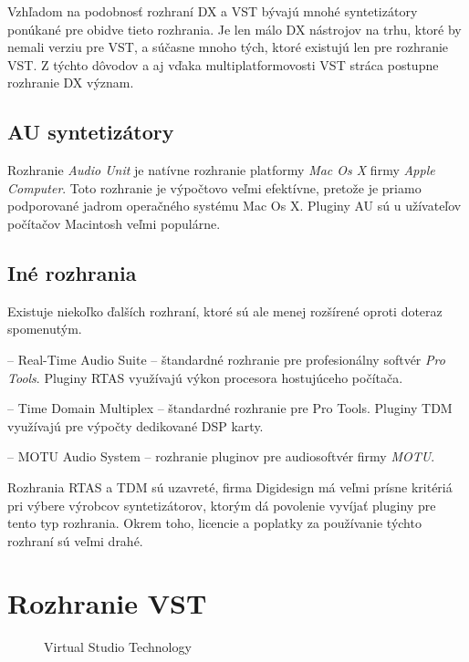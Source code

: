 Vzhľadom na podobnosť rozhraní DX a VST bývajú mnohé syntetizátory ponúkané pre obidve tieto rozhrania. Je len málo DX nástrojov na trhu, ktoré by nemali verziu pre VST, a súčasne mnoho tých, ktoré existujú len pre rozhranie VST. Z týchto dôvodov a aj vďaka multiplatformovosti VST stráca postupne rozhranie DX význam.

\subsection{AU syntetizátory}

Rozhranie \emph{Audio Unit} je natívne rozhranie platformy \emph{Mac Os X} firmy \emph{Apple Computer}. Toto rozhranie je výpočtovo veľmi efektívne, pretože je priamo podporované jadrom operačného systému Mac Os X. 
Pluginy AU sú u užívateľov počítačov Macintosh veľmi populárne.

\subsection{Iné rozhrania}

Existuje niekoľko ďalších rozhraní, ktoré sú ale menej rozšírené oproti doteraz spomenutým.

\begin{description}
\setlength{\itemsep}{-0.5ex}
\item[RTAS] -- Real-Time Audio Suite -- štandardné rozhranie pre profesionálny softvér \emph{Pro Tools}. Pluginy RTAS využívajú výkon procesora hostujúceho počítača.
\item[TDM] -- Time Domain Multiplex -- štandardné rozhranie pre Pro Tools. Pluginy TDM využívajú pre výpočty dedikované DSP karty.
\item[MAS] -- MOTU Audio System -- rozhranie pluginov pre audiosoftvér firmy \emph{MOTU}.
\end{description}

Rozhrania RTAS a TDM sú uzavreté, firma Digidesign má veľmi prísne kritériá pri výbere výrobcov syntetizátorov, ktorým dá povolenie vyvíjať pluginy pre tento typ rozhrania. Okrem toho, licencie a poplatky za používanie týchto rozhraní sú veľmi drahé.

\section{Rozhranie VST}

\begin{figure}[ht]
\centering
{}
\caption{\label{obr03} Virtual Studio Technology}
\end{figure}

